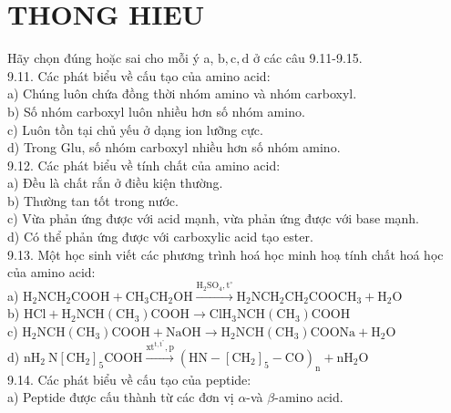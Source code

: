 \documentclass[10pt]{article}
\begin{document}
\section*{THONG HIEU}
Hãy chọn đúng hoặc sai cho mỗi ý a, $\mathrm{b}, \mathrm{c}, \mathrm{d}$ ở các câu 9.11-9.15.\\
9.11. Các phát biểu về cấu tạo của amino acid:\\
a) Chúng luôn chứa đồng thời nhóm amino và nhóm carboxyl.\\
b) Số nhóm carboxyl luôn nhiều hơn số nhóm amino.\\
c) Luôn tồn tại chủ yếu ở dạng ion lưỡng cực.\\
d) Trong Glu, số nhóm carboxyl nhiều hơn số nhóm amino.\\
9.12. Các phát biểu về tính chất của amino acid:\\
a) Đều là chất rắn ở điều kiện thường.\\
b) Thường tan tốt trong nước.\\
c) Vừa phản ứng được với acid mạnh, vừa phản ứng được với base mạnh.\\
d) Có thể phản ứng được với carboxylic acid tạo ester.\\
9.13. Một học sinh viết các phương trình hoá học minh hoạ tính chất hoá học của amino acid:\\
a) $\mathrm{H}_{2} \mathrm{NCH}_{2} \mathrm{COOH}+\mathrm{CH}_{3} \mathrm{CH}_{2} \mathrm{OH} \xrightarrow{\mathrm{H}_{2} \mathrm{SO}_{4}, \mathrm{t}^{\circ}} \mathrm{H}_{2} \mathrm{NCH}_{2} \mathrm{CH}_{2} \mathrm{COOCH}_{3}+\mathrm{H}_{2} \mathrm{O}$\\
b) $\mathrm{HCl}+\mathrm{H}_{2} \mathrm{NCH}\left(\mathrm{CH}_{3}\right) \mathrm{COOH} \longrightarrow \mathrm{ClH}_{3} \mathrm{NCH}\left(\mathrm{CH}_{3}\right) \mathrm{COOH}$\\
c) $\mathrm{H}_{2} \mathrm{NCH}\left(\mathrm{CH}_{3}\right) \mathrm{COOH}+\mathrm{NaOH} \longrightarrow \mathrm{H}_{2} \mathrm{NCH}\left(\mathrm{CH}_{3}\right) \mathrm{COONa}+\mathrm{H}_{2} \mathrm{O}$\\
d) $\mathrm{nH}_{2} \mathrm{~N}\left[\mathrm{CH}_{2}\right]_{5} \mathrm{COOH} \xrightarrow{\mathrm{xt}^{\mathrm{t}, \mathrm{t}^{\circ}}, \mathrm{p}}\left(\mathrm{HN}-\left[\mathrm{CH}_{2}\right]_{5}-\mathrm{CO}\right)_{\mathrm{n}}+\mathrm{nH}_{2} \mathrm{O}$\\
9.14. Các phát biểu về cấu tạo của peptide:\\
a) Peptide được cấu thành từ các đơn vị $\alpha$-và $\beta$-amino acid.\\
\end{document}
